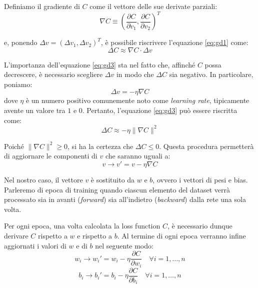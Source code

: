 Definiamo il gradiente di $C$ come il vettore delle 
sue derivate parziali:
\begin{equation}
    \nabla C \equiv \left(
    \frac{\partial C}{\partial v_1},  
    \frac{\partial C}{\partial v_2}
    \right)^T
    \label{eq:gd2}
\end{equation}

e, ponendo $\Delta v = (\Delta v_1, \Delta v_2)^T$, è possibile riscrivere 
l’equazione \eqref{eq:gd1} come:
\begin{equation}
    \Delta C \approx \nabla C \cdot \Delta v
    \label{eq:gd3}
\end{equation}

L’importanza dell’equazione \eqref{eq:gd3} sta nel fatto che, affinché $C$ 
possa decrescere, è necessario scegliere $\Delta v$ in modo 
che $\Delta C$ sia negativo. In particolare, poniamo:
\begin{equation}
    \Delta v = -\eta \nabla C
\end{equation}
dove $\eta$ è un numero positivo comunemente noto come \textit{learning rate}, tipicamente avente 
un valore tra $1$ e $0$. 
Pertanto, l’equazione \eqref{eq:gd3} può essere riscritta come:
\begin{equation}
    \Delta C \approx -\eta \|\nabla C\|^2
\end{equation}

Poiché $\|\nabla C\|^2 \geq 0$, si ha la certezza che $\Delta C \leq 0$. Questa procedura permetterà di aggiornare le componenti di $v$ che saranno uguali a:
\begin{equation}
    v \to v' = v - \eta \nabla C
\end{equation}

Nel nostro caso, il vettore \textbf{$v$} è sostituito da $w$ e $b$, ovvero i 
vettori di pesi e bias. Parleremo di epoca di training quando ciascun elemento 
del dataset verrà processato sia in avanti (\textit{forward}) sia all’indietro 
(\textit{backward}) dalla rete una sola volta.

Per ogni epoca, una volta calcolata la loss function $C$, è necessario dunque 
derivare $C$ rispetto a $w$ e rispetto a $b$. Al termine di ogni epoca verranno 
infine aggiornati i valori di \textbf{$w$} e di \textbf{$b$} nel seguente modo:
\begin{equation}
    w_i \to w_i' = w_i - \eta \frac{\partial C}{\partial w_i} \quad \forall i = 1, \dots, n
    \label{eq:aggiornamentoPesi}
\end{equation}
\begin{equation}
    b_i \to b_i' = b_i - \eta \frac{\partial C}{\partial b_i} \quad \forall i = 1, \dots, n
    \label{eq:aggiornamentoBias}
\end{equation}


